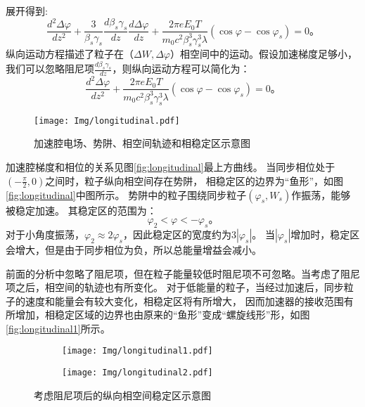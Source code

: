 展开得到:
\begin{equation}
    \label{eq:longitudinal_equation2}
        \frac{d^2 \Delta \varphi}{dz^2}
        +\frac{3}{\beta_s \gamma_s} \frac{d\beta_s \gamma_s}{dz} \frac{d\Delta \varphi}{dz}
        +\frac{2\pi e E_0 T}{m_0 c^2 \beta_s^3 \gamma_s^3 \lambda} (\cos {\varphi} - \cos {\varphi}_s)
        =0 \text{。}
\end{equation}
纵向运动方程描述了粒子在（$\Delta W , \Delta \varphi$）相空间中的运动。假设加速梯度足够小，我们可以忽略阻尼项$\frac{d\beta_s \gamma_s}{dz}$，则纵向运动方程可以简化为：
\begin{equation}
    \label{eq:longitudinal_equation2_concise}
        \frac{d^2 \Delta \varphi}{dz^2}
        +\frac{2\pi e E_0 T}{m_0 c^2 \beta_s^3 \gamma_s^3 \lambda} (\cos {\varphi} - \cos {\varphi}_s)
        =0 \text{。}
\end{equation}

\begin{figure}[!htb]
    \centering
    \texttt{[image: Img/longitudinal.pdf]}
    \caption{加速腔电场、势阱、相空间轨迹和相稳定区示意图}
    \label{fig:longitudinal}
\end{figure}

加速腔梯度和相位的关系见图\eqref{fig:longitudinal}最上方曲线\cite{wangler1998principles}。
当同步相位处于$(-\frac{\pi}{2},0)$之间时，粒子纵向相空间存在势阱，
相稳定区的边界为“鱼形”，如图\eqref{fig:longitudinal}中图所示。
势阱中的粒子围绕同步粒子$(\varphi_s,W_s)$作振荡，能够被稳定加速。
其稳定区的范围为：
\begin{equation}
    \label{eq:longitudinal_phi}
        \varphi_2 < \varphi < -\varphi_s \text{。}
\end{equation}
对于小角度振荡，$\varphi_2 \approx 2\varphi_s$，因此稳定区的宽度约为$3|\varphi_s|$。
当$|\varphi_s|$增加时，稳定区会增大，但是由于同步相位为负，所以总能量增益会减小。

前面的分析中忽略了阻尼项，但在粒子能量较低时阻尼项不可忽略。当考虑了阻尼项之后，相空间的轨迹也有所变化。
对于低能量的粒子，当经过加速后，同步粒子的速度和能量会有较大变化，相稳定区将有所增大，
因而加速器的接收范围有所增加，相稳定区域的边界也由原来的“鱼形”变成“螺旋线形”形，如图\eqref{fig:longitudinal1}所示\cite{wangler1998principles}。

\begin{figure}[!htb]
    \centering
    \begin{subfigure}[b]{0.48\textwidth}
        \texttt{[image: Img/longitudinal1.pdf]}
    \end{subfigure}
    \begin{subfigure}[b]{0.45\textwidth}
        \texttt{[image: Img/longitudinal2.pdf]}
    \end{subfigure}
    \caption{考虑阻尼项后的纵向相空间稳定区示意图}
    \label{fig:longitudinal1}
\end{figure}


